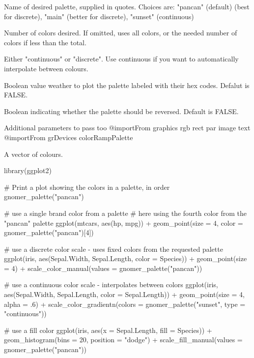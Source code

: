 \documentclass[a4paper]{book}
\begin{document}
%
\begin{Arguments}
\begin{ldescription}
\item[\code{name}] Name of desired palette, supplied in quotes. Choices are:
"pancan" (default) (best for discrete), "main" (better for discrete), "sunset" (continuous)

\item[\code{n}] Number of colors desired. If omitted, uses all colors,
or the needed number of colors if less than the total.

\item[\code{type}] Either "continuous" or "discrete". Use continuous if you want
to automatically interpolate between colours.

\item[\code{plot\_col}] Boolean value weather to plot the palette labeled with their hex codes. Defalut is FALSE.

\item[\code{reverse}] Boolean indicating whether the palette should be reversed.
Default is FALSE.

\item[\code{...}] Additional parameters to pass too 
@importFrom graphics rgb rect par image text
@importFrom grDevices colorRampPalette
\end{ldescription}
\end{Arguments}
%
\begin{Value}
A vector of colours.
\end{Value}
%
\begin{Examples}
\begin{ExampleCode}

library(ggplot2)

# Print a plot showing the colors in a palette, in order
gnomer_palette("pancan")

# use a single brand color from a palette
# here using the fourth color from the "pancan" palette
ggplot(mtcars, aes(hp, mpg)) +
geom_point(size = 4, color = gnomer_palette("pancan")[4])

# use a discrete color scale - uses fixed colors from the requested palette
ggplot(iris, aes(Sepal.Width, Sepal.Length, color = Species)) +
geom_point(size = 4) +
scale_color_manual(values = gnomer_palette("pancan"))

# use a continuous color scale - interpolates between colors
ggplot(iris, aes(Sepal.Width, Sepal.Length, color = Sepal.Length)) +
geom_point(size = 4, alpha = .6) +
scale_color_gradientn(colors = gnomer_palette("sunset", type = "continuous"))

# use a fill color
ggplot(iris, aes(x = Sepal.Length, fill = Species)) +
geom_histogram(bins = 20, position = "dodge") +
scale_fill_manual(values = gnomer_palette("pancan"))

\end{ExampleCode}
\end{Examples}
\end{document}
